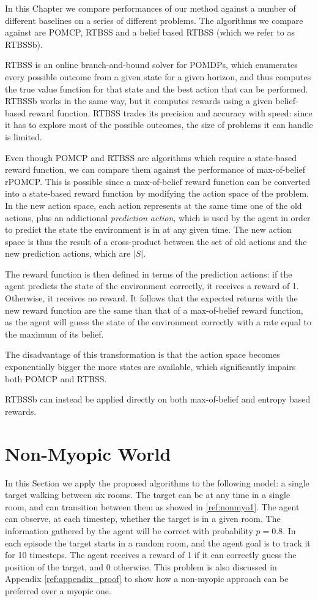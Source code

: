 In this Chapter we compare performances of our method against a number of different baselines on
a series of different problems. The algorithms we compare against are POMCP, RTBSS and a belief
based RTBSS (which we refer to as RTBSSb).

RTBSS is an online branch-and-bound solver for POMDPs, which enumerates every possible outcome from
a given state for a given horizon, and thus computes the true value function for that state and
the best action that can be performed. RTBSSb works in the same way, but it computes rewards using a
given belief-based reward function. RTBSS trades its precision and accuracy with speed: since it has
to explore most of the possible outcomes, the size of problems it can handle is limited.

Even though POMCP and RTBSS are algorithms which require a state-based reward function, we can
compare them against the performance of max-of-belief rPOMCP. This is possible since a max-of-belief
reward function can be converted into a state-based reward function by modifying the action space of
the problem. In the new action space, each action represents at the same time one of the old
actions, plus an addictional \textit{prediction action}, which is used by the agent in order to
predict the state the environment is in at any given time. The new action space is thus the result
of a cross-product between the set of old actions and the new prediction actions, which are $|S|$.

The reward function is then defined in terms of the prediction actions: if the agent predicts the
state of the environment correctly, it receives a reward of 1. Otherwise, it receives no reward. It
follows that the expected returns with the new reward function are the same than that of a
max-of-belief reward function, as the agent will guess the state of the environment correctly with a
rate equal to the maximum of its belief.

The disadvantage of this transformation is that the action space becomes exponentially bigger the
more states are available, which significantly impairs both POMCP and RTBSS.

RTBSSb can instead be applied directly on both max-of-belief and entropy based rewards.

\section{Non-Myopic World}

In this Section we apply the proposed algorithms to the following model: a single target walking
between six rooms. The target can be at any time in a single room, and can transition between them
as showed in \ref{ref:nonmyo1}. The agent can observe, at each timestep, whether the target is in a
given room. The information gathered by the agent will be correct with probability $p=0.8$. In each
episode the target starts in a random room, and the agent goal is to track it for 10 timesteps. The
agent receives a reward of 1 if it can correctly guess the position of the target, and 0 otherwise.
This problem is also discussed in Appendix \ref{ref:appendix_proof} to show how a non-myopic
approach can be preferred over a myopic one.

